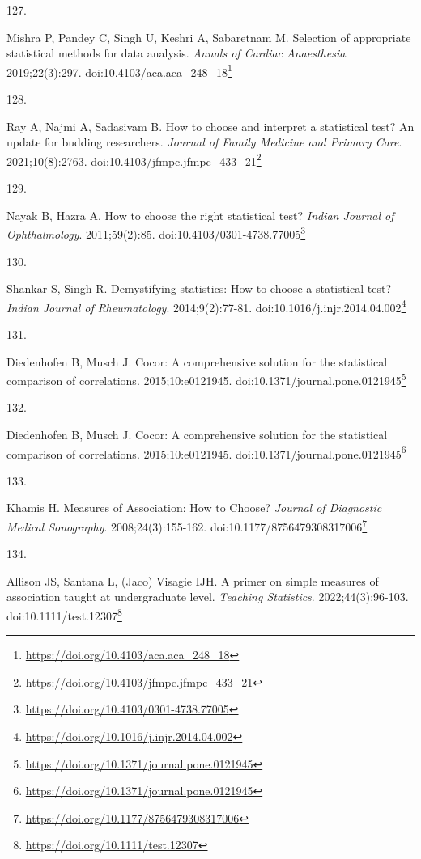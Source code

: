 \documentclass[
  a4paper,
]{book}
\newlength{\cslhangindent}
\newlength{\csllabelwidth}
\newlength{\cslentryspacingunit} %
\newenvironment{CSLReferences}[2] %
 {%
  \setlength{\parindent}{0pt}
  \ifodd #1
  \let\oldpar\par
  \def\par{\hangindent=\cslhangindent\oldpar}
  \fi
  \setlength{\parskip}{#2\cslentryspacingunit}
 }%
 {}
\newcommand{\CSLLeftMargin}[1]{\parbox[t]{\csllabelwidth}{#1}}
\newcommand{\CSLRightInline}[1]{\parbox[t]{\linewidth - \csllabelwidth}{#1}\break}
\renewcommand{\href}[2]{#2\footnote{\url{#1}}}
\begin{document}
\begin{CSLReferences}{0}{0}
\leavevmode{}%
\CSLLeftMargin{127. }%
\CSLRightInline{Mishra P, Pandey C, Singh U, Keshri A, Sabaretnam M. Selection of appropriate statistical methods for data analysis. \emph{Annals of Cardiac Anaesthesia}. 2019;22(3):297. doi:\href{https://doi.org/10.4103/aca.aca_248_18}{10.4103/aca.aca\_248\_18}}

\leavevmode{}%
\CSLLeftMargin{128. }%
\CSLRightInline{Ray A, Najmi A, Sadasivam B. How to choose and interpret a statistical test? An update for budding researchers. \emph{Journal of Family Medicine and Primary Care}. 2021;10(8):2763. doi:\href{https://doi.org/10.4103/jfmpc.jfmpc_433_21}{10.4103/jfmpc.jfmpc\_433\_21}}

\leavevmode{}%
\CSLLeftMargin{129. }%
\CSLRightInline{Nayak B, Hazra A. How to choose the right statistical test? \emph{Indian Journal of Ophthalmology}. 2011;59(2):85. doi:\href{https://doi.org/10.4103/0301-4738.77005}{10.4103/0301-4738.77005}}

\leavevmode{}%
\CSLLeftMargin{130. }%
\CSLRightInline{Shankar S, Singh R. Demystifying statistics: How to choose a statistical test? \emph{Indian Journal of Rheumatology}. 2014;9(2):77-81. doi:\href{https://doi.org/10.1016/j.injr.2014.04.002}{10.1016/j.injr.2014.04.002}}

\leavevmode{}%
\CSLLeftMargin{131. }%
\CSLRightInline{Diedenhofen B, Musch J. Cocor: A comprehensive solution for the statistical comparison of correlations. 2015;10:e0121945. doi:\href{https://doi.org/10.1371/journal.pone.0121945}{10.1371/journal.pone.0121945}}

\leavevmode{}%
\CSLLeftMargin{132. }%
\CSLRightInline{Diedenhofen B, Musch J. Cocor: A comprehensive solution for the statistical comparison of correlations. 2015;10:e0121945. doi:\href{https://doi.org/10.1371/journal.pone.0121945}{10.1371/journal.pone.0121945}}

\leavevmode{}%
\CSLLeftMargin{133. }%
\CSLRightInline{Khamis H. Measures of Association: How to Choose? \emph{Journal of Diagnostic Medical Sonography}. 2008;24(3):155-162. doi:\href{https://doi.org/10.1177/8756479308317006}{10.1177/8756479308317006}}

\leavevmode{}%
\CSLLeftMargin{134. }%
\CSLRightInline{Allison JS, Santana L, (Jaco) Visagie IJH. A primer on simple measures of association taught at undergraduate level. \emph{Teaching Statistics}. 2022;44(3):96-103. doi:\href{https://doi.org/10.1111/test.12307}{10.1111/test.12307}}


\end{CSLReferences}
\end{document}
